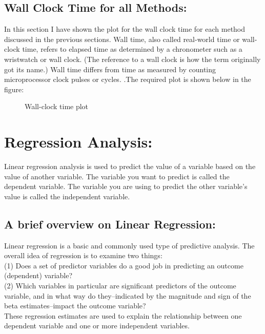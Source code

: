 \documentclass[12pt,a4paper]{article}
\begin{document}
\subsection{Wall Clock Time for all Methods:}
In this section I have shown the plot for the wall clock time for each method discussed in the previous sections. Wall time, also called real-world time or wall-clock time, refers to elapsed time as determined by a chronometer such as a wristwatch or wall clock. (The reference to a wall clock is how the term originally got its name.) Wall time differs from time as measured by counting microprocessor clock pulses or cycles. .The required plot is shown below in the figure:
\clearpage
\begin{figure}[!ht]
	\begin{center}
	\end{center}
	\caption{Wall-clock time plot}
	\label{wall-clock time plot}
\end{figure}

\section{Regression Analysis:}
Linear regression analysis is used to predict the value of a variable based on the value of another variable. The variable you want to predict is called the dependent variable. The variable you are using to predict the other variable's value is called the independent variable.
\subsection{A brief overview on Linear Regression:}
Linear regression is a basic and commonly used type of predictive analysis.  The overall idea of regression is to examine two things: \\
(1) Does a set of predictor variables do a good job in predicting an outcome (dependent) variable? \\ 
(2) Which variables in particular are significant predictors of the outcome variable, and in what way do they–indicated by the magnitude and sign of the beta estimates–impact the outcome variable? \\
These regression estimates are used to explain the relationship between one dependent variable and one or more independent variables. 
\end{document}
